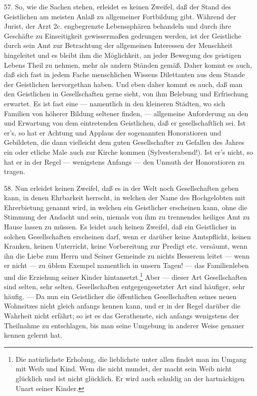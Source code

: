 57. So, wie die Sachen stehen, erleidet es keinen Zweifel, daß der Stand des Geistlichen am meisten Anlaß zu allgemeiner Fortbildung gibt. Während der Jurist, der Arzt 2c. engbegrenzte Lebenssphären behandeln und durch ihre Geschäfte zu Einseitigkeit gewissermaßen gedrungen werden, ist der Geistliche durch sein Amt zur Betrachtung der allgemeinen Interessen der Menschheit hingeleitet und es bleibt ihm die Möglichkeit, an jeder Bewegung des geistigen Lebens Theil zu nehmen, mehr als andern Ständen gemäß. Daher kommt es auch, daß sich fast in jedem Fache menschlichen Wissens Dilettanten aus dem Stande der Geistlichen hervorgethan haben. Und eben daher kommt es auch, daß man den Geistlichen in Gesellschaften gerne sieht, von ihm Belebung und Erfrischung erwartet. Es ist fast eine — namentlich in den kleineren Städten, wo sich Familien von höherer Bildung seltener finden, — allgemeine Anforderung an den und Erwartung von dem eintretenden Geistlichen, daß er gesellschaftlich sei. Ist er’s, so hat er Achtung und Applaus der sogenannten Honoratioren und Gebildeten, die dann vielleicht dem guten Gesellschafter zu Gefallen des Jahres ein oder etliche Male auch zur Kirche kommen (Sylvesterabend!). Ist er’s nicht, so hat er in der Regel
— wenigstens Anfangs — den Unmuth der Honoratioren zu tragen.

58. Nun erleidet keinen Zweifel, daß es in der Welt noch Gesellschaften geben kann, in denen Ehrbarkeit herrscht, in welchen der Name des Hochgelobten mit Ehrerbietung genannt wird, in welchen ein Geistlicher erscheinen kann, ohne die Stimmung der Andacht und sein, niemals von ihm zu trennendes heiliges Amt zu Hause lassen zu müssen. Es leidet auch keinen Zweifel, daß ein Geistlicher in solchen Gesellschaften erscheinen darf, wenn er darüber keine Amtspflicht, keinen Kranken, keinen Unterricht, keine Vorbereitung zur Predigt etc. versäumt, wenn ihn die Liebe zum Herrn und Seiner Gemeinde zu nichts Besserem leitet — wenn er nicht — zu üblem Exempel namentlich in unsern Tagen! — das Familienleben und die Erziehung seiner Kinder hintansetzt.\footnote{Die natürlichste Erholung, die lieblichste unter allen findet man im Umgang mit Weib und Kind. Wem die nicht mundet, der macht sein Weib nicht glücklich und ist nicht glücklich. Er wird auch schuldig an der hartnäckigen Unart seiner Kinder.} Aber — dieser Art Gesellschaften sind selten, sehr selten. Gesellschaften entgegengesetzter Art sind häufiger, sehr häufig. — Da nun ein Geistlicher die öffentlichen Gesellschaften seines neuen Wohnsitzes nicht gleich anfangs kennen kann, und er in der Regel darüber die Wahrheit nicht erfährt; so ist es das Gerathenste, sich anfangs wenigstens der Theilnahme zu entschlagen, bis man seine Umgebung in anderer Weise genauer kennen gelernt hat.

